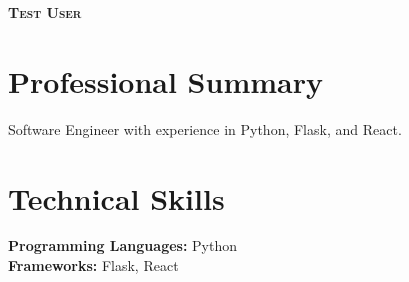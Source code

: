 \documentclass[a4paper,10pt]{article}
\begin{document}
\begin{minipage}[t]{0.75\textwidth}
  \begin{center}
    {\Huge\bfseries\scshape Test User} \\[8pt]
    \small 
      \end{center}
\end{minipage}%

\vspace{8pt}

\section{Professional Summary}
\small{Software Engineer with experience in Python, Flask, and React.}
\vspace{6pt}



\section{Technical Skills}
\small{
    \textbf{Programming Languages:} Python \\
    \textbf{Frameworks:} Flask, React \\
  }
\vspace{6pt}




\end{document}
